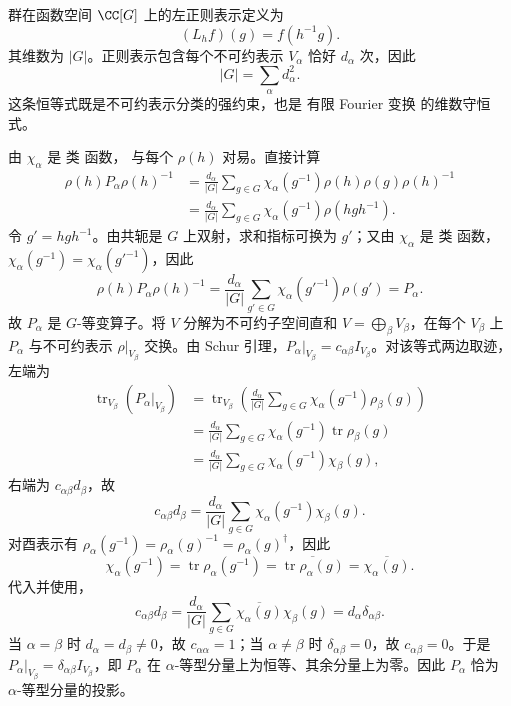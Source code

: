 群在函数空间 $\CC[G]$ 上的左正则表示定义为
\[
(L_hf)(g)=f(h^{-1}g).
\]
其维数为 $|G|$。正则表示包含每个不可约表示 $V_\alpha$ 恰好 $d_\alpha$ 次，因此
\begin{equation*}|G|=\sum_\alpha d_\alpha^2.\end{equation*}
这条恒等式既是不可约表示分类的强约束，也是 有限 Fourier 变换 的维数守恒式。

由 $\chi_\alpha$ 是 类 函数， 与每个 $\rho(h)$ 对易。直接计算
\begin{align*}
\rho(h)P_\alpha\rho(h)^{-1}
&=\frac{d_\alpha}{|G|}
\sum_{g\in G}
\chi_\alpha(g^{-1})\rho(h)\rho(g)\rho(h)^{-1}\\
&=\frac{d_\alpha}{|G|}
\sum_{g\in G}
\chi_\alpha(g^{-1})\rho(hgh^{-1}).
\end{align*}
令 $g'=hgh^{-1}$。由共轭是 $G$ 上双射，求和指标可换为 $g'$；又由 $\chi_\alpha$ 是 类 函数，$\chi_\alpha(g^{-1})=\chi_\alpha(g'^{-1})$，因此
\[
\rho(h)P_\alpha\rho(h)^{-1}
=\frac{d_\alpha}{|G|}
\sum_{g'\in G}
\chi_\alpha(g'^{-1})\rho(g')
=P_\alpha.
\]
故 $P_\alpha$ 是 $G$-等变算子。将 $V$ 分解为不可约子空间直和 $V=\bigoplus_\beta V_\beta$，在每个 $V_\beta$ 上 $P_\alpha$ 与不可约表示 $\rho|_{V_\beta}$ 交换。由 Schur 引理，$P_\alpha|_{V_\beta}=c_{\alpha\beta}I_{V_\beta}$。对该等式两边取迹，左端为
\begin{align*}
\operatorname{tr}_{V_\beta}(P_\alpha|_{V_\beta})
&=\operatorname{tr}_{V_\beta}\!\left(
\frac{d_\alpha}{|G|}
\sum_{g\in G}
\chi_\alpha(g^{-1})\rho_\beta(g)\right)\\
&=\frac{d_\alpha}{|G|}
\sum_{g\in G}
\chi_\alpha(g^{-1})\operatorname{tr}\rho_\beta(g)\\
&=\frac{d_\alpha}{|G|}
\sum_{g\in G}
\chi_\alpha(g^{-1})\chi_\beta(g),
\end{align*}
右端为 $c_{\alpha\beta}d_\beta$，故
\[
c_{\alpha\beta}d_\beta
=
\frac{d_\alpha}{|G|}
\sum_{g\in G}
\chi_\alpha(g^{-1})\chi_\beta(g).
\]
对酉表示有 $\rho_\alpha(g^{-1})=\rho_\alpha(g)^{-1}=\rho_\alpha(g)^\dagger$，因此
\[
\chi_\alpha(g^{-1})
=\operatorname{tr}\rho_\alpha(g^{-1})
=\overline{\operatorname{tr}\rho_\alpha(g)}
=\overline{\chi_\alpha(g)}.
\]
代入并使用，
\[
c_{\alpha\beta}d_\beta
=\frac{d_\alpha}{|G|}
\sum_{g\in G}
\overline{\chi_\alpha(g)}\chi_\beta(g)
=d_\alpha\delta_{\alpha\beta}.
\]
当 $\alpha=\beta$ 时 $d_\alpha=d_\beta\neq0$，故 $c_{\alpha\alpha}=1$；当 $\alpha\neq\beta$ 时 $\delta_{\alpha\beta}=0$，故 $c_{\alpha\beta}=0$。于是 $P_\alpha|_{V_\beta}=\delta_{\alpha\beta}I_{V_\beta}$，即 $P_\alpha$ 在 $\alpha$-等型分量上为恒等、其余分量上为零。因此 $P_\alpha$ 恰为 $\alpha$-等型分量的投影。

